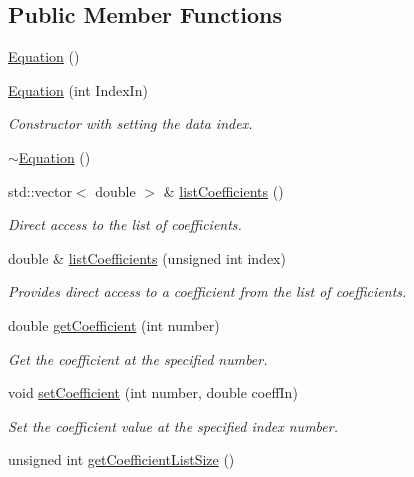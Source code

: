 \subsection*{Public Member Functions}
\begin{DoxyCompactItemize}
\item 
\hyperlink{classosea_1_1ofreq_1_1_equation_a68511fc719250ed80f86c50de9136733}{Equation} ()
\item 
\hyperlink{classosea_1_1ofreq_1_1_equation_a37fec641aec75302c37590d191421790}{Equation} (int Index\-In)
\begin{DoxyCompactList}\small\item\em Constructor with setting the data index. \end{DoxyCompactList}\item 
\hyperlink{classosea_1_1ofreq_1_1_equation_a097243d0dfd608330fc91f115a0d15bb}{$\sim$\-Equation} ()
\item 
std\-::vector$<$ double $>$ \& \hyperlink{classosea_1_1ofreq_1_1_equation_a4277bda09b538c1523d451afcc55787a}{list\-Coefficients} ()
\begin{DoxyCompactList}\small\item\em Direct access to the list of coefficients. \end{DoxyCompactList}\item 
double \& \hyperlink{classosea_1_1ofreq_1_1_equation_a198eb9e2816a5cd316b8bdc07d505568}{list\-Coefficients} (unsigned int index)
\begin{DoxyCompactList}\small\item\em Provides direct access to a coefficient from the list of coefficients. \end{DoxyCompactList}\item 
double \hyperlink{classosea_1_1ofreq_1_1_equation_a6aa77458d50e80de2a31708756c7925b}{get\-Coefficient} (int number)
\begin{DoxyCompactList}\small\item\em Get the coefficient at the specified number. \end{DoxyCompactList}\item 
void \hyperlink{classosea_1_1ofreq_1_1_equation_a96dd6f24624703a1ff3ffb4d19a76582}{set\-Coefficient} (int number, double coeff\-In)
\begin{DoxyCompactList}\small\item\em Set the coefficient value at the specified index number. \end{DoxyCompactList}\item 
unsigned int \hyperlink{classosea_1_1ofreq_1_1_equation_aa3ceaac689d9cfef1a1b3123d8ec4027}{get\-Coefficient\-List\-Size} ()

\end{DoxyCompactItemize}
